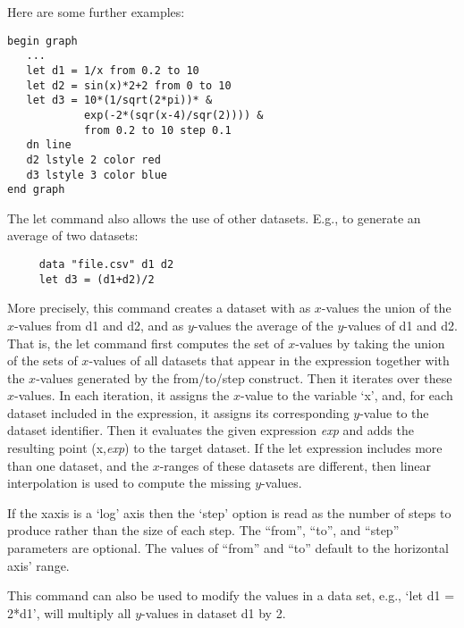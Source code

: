 \begin{commanddescription}
Here are some further examples:

\begin{minipage}[c]{8cm}
\begin{Verbatim}
begin graph
   ...
   let d1 = 1/x from 0.2 to 10
   let d2 = sin(x)*2+2 from 0 to 10
   let d3 = 10*(1/sqrt(2*pi))* &
            exp(-2*(sqr(x-4)/sqr(2)))) &
            from 0.2 to 10 step 0.1
   dn line
   d2 lstyle 2 color red
   d3 lstyle 3 color blue
end graph
\end{Verbatim}
\end{minipage}
\hfill
\begin{minipage}[c]{7cm}
\mbox{}
\end{minipage}
\vspace{0.2cm}

The let command also allows the use of other datasets. E.g., to generate an average of two datasets:

\begin{Verbatim}
     data "file.csv" d1 d2
     let d3 = (d1+d2)/2
\end{Verbatim}

More precisely, this command creates a dataset with as $x$-values the union of the $x$-values from d1 and d2, and as $y$-values the average of the $y$-values of d1 and d2. That is, the let command first computes the set of $x$-values by taking the union of the sets of $x$-values of all datasets that appear in the expression together with the $x$-values generated by the from/to/step construct. Then it iterates over these $x$-values. In each iteration, it assigns the $x$-value to the variable `x', and, for each dataset included in the expression, it assigns its corresponding $y$-value to the dataset identifier. Then it evaluates the given expression {\it exp} and adds the resulting point (x,{\it exp}) to the target dataset. If the let expression includes more than one dataset, and the $x$-ranges of these datasets are different, then linear interpolation is used to compute the missing $y$-values.

If the xaxis is a `log' axis then the `step' option is read as the number of steps to produce rather than the size of each step. The ``from'', ``to'', and ``step'' parameters are optional. The values of ``from'' and ``to'' default to the horizontal axis' range.

This command can also be used to modify the values in a data set, e.g., `let d1 = 2*d1', will multiply all $y$-values in dataset d1 by 2.


\end{commanddescription}
